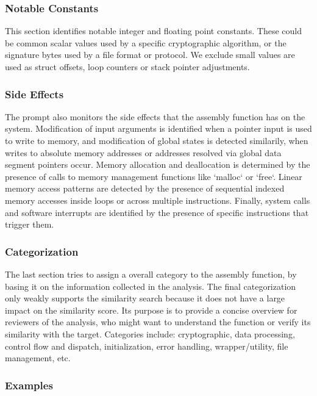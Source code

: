 \documentclass[conference,compsoc]{IEEEtran}
\begin{document}
\subsubsection{Notable Constants}

This section identifies notable integer and floating point constants.  These could be common scalar values used by
a specific cryptographic algorithm, or the signature bytes used by a file format or protocol. We exclude small
values are used as struct offsets, loop counters or stack pointer adjustments.

\subsubsection{Side Effects}

The prompt also monitors the side effects that the assembly function has on the system.
Modification of input arguments is identified when a pointer input is used to write to memory, and modification
of global states is detected similarily, when writes to absolute memory addresses or addresses resolved via global
data segment pointers occur. Memory allocation and deallocation is determined by the presence of calls to memory
management functions like `malloc` or `free`. Linear memory access patterns are detected by the presence of sequential
indexed memory accesses inside loops or across multiple instructions. Finally, system calls and software interrupts are
identified by the presence of specific instructions that trigger them.

\subsubsection{Categorization}

The last section tries to assign a overall category to the assembly function, by basing it on the information
collected in the analysis. The final categorization only weakly supports the similarity search because it does
not have a large impact on the similarity score. Its purpose is to provide a concise overview for reviewers
of the analysis, who might want to understand the function or verify its similarity with the target.
Categories include: cryptographic, data processing, control flow and dispatch, initialization, error handling,
wrapper/utility, file management, etc.

\subsubsection{Examples}
\end{document}
